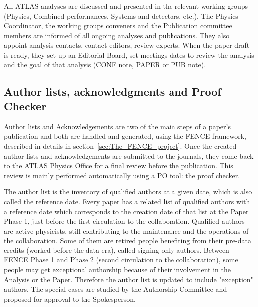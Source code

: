 All ATLAS analyses are discussed and presented in the relevant working groups (Physics, Combined performances, Systems and detectors, etc.). The Physics Coordinator, the working groups conveners and the Publication committee members are informed of all ongoing analyses and publications. They also appoint analysis contacts, contact editors, review experts. When the paper draft is ready, they set up an Editorial Board, set meetings dates to review the analysis and the goal of that analysis (CONF note, PAPER or PUB note).

\subsection{Author lists, acknowledgments and Proof Checker}
\label{sec:Authorlists_acknowledgments_and_ProofChecker}

Author lists and Acknowledgements are two of the main steps of a paper’s publication and both are handled and generated, using the FENCE framework, described in details in section~\ref{sec:The_FENCE_project}. Once the created author lists and acknowledgements are submitted to the journals, they come back to the ATLAS Physics Office for a final review before the publication. This review is mainly performed automatically using a PO tool: the proof checker.
                                                           
The author list is the inventory of qualified authors at a given date, which is also called the reference date. Every paper has a related list of qualified authors with a reference date which corresponds to the creation date of that list at the Paper Phase 1, just before the first circulation to the collaboration. Qualified authors are active physicists, still contributing to the maintenance and the operations of the collaboration. Some of them are retired people benefiting from their pre-data credits (worked before the data era), called signing-only authors. Between FENCE Phase 1 and Phase 2 (second circulation to the collaboration), some people may get exceptional authorship because of their involvement in the Analysis or the Paper. Therefore the author list is updated to include "exception" authors. The special cases are studied by the Authorship Committee and proposed for approval to the Spokesperson.
 
